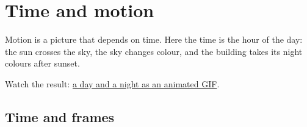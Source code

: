 \chapter{Time and motion}\label{ch:motion}

Motion is a picture that depends on time. Here the time is the hour of the day: the sun crosses the sky, the sky changes colour, and the building takes its night colours after sunset.

Watch the result: \href{https://ahmadammar.github.io/files/pixel-animation/day_and_night.gif}{a day and a night as an animated GIF}.

\section{Time and frames}

